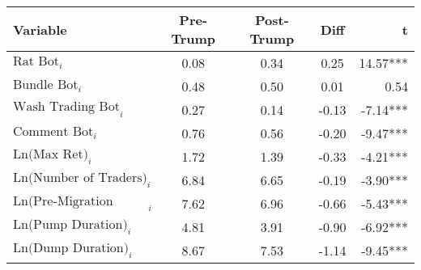 \begin{tabular}{lcccr}
\hline
Variable & Pre-Trump & Post-Trump & Diff & t \\
\hline
$\text{Rat Bot}_{i}$ & 0.08 & 0.34 & 0.25 & 14.57*** \\
$\text{Bundle Bot}_{i}$ & 0.48 & 0.50 & 0.01 & 0.54 \\
$\text{Wash Trading Bot}_{i}$ & 0.27 & 0.14 & -0.13 & -7.14*** \\
$\text{Comment Bot}_{i}$ & 0.76 & 0.56 & -0.20 & -9.47*** \\
$\text{Ln(Max Ret)}_{i}$ & 1.72 & 1.39 & -0.33 & -4.21*** \\
$\text{Ln(Number of Traders)}_{i}$ & 6.84 & 6.65 & -0.19 & -3.90*** \\
$\text{Ln(Pre-Migration Duration)}_{i}$ & 7.62 & 6.96 & -0.66 & -5.43*** \\
$\text{Ln(Pump Duration)}_{i}$ & 4.81 & 3.91 & -0.90 & -6.92*** \\
$\text{Ln(Dump Duration)}_{i}$ & 8.67 & 7.53 & -1.14 & -9.45*** \\
\hline
\end{tabular}